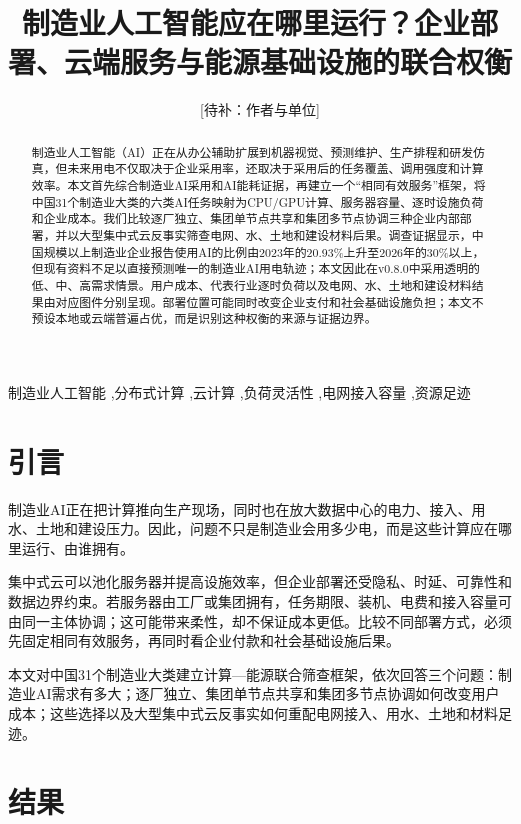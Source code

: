 \documentclass[preprint,12pt]{elsarticle}
\newcommand{\tbd}[1]{\textcolor{red!70!black}{[待补：#1]}}
\begin{document}
\begin{frontmatter}

\title{制造业人工智能应在哪里运行？企业部署、云端服务与能源基础设施的联合权衡}

\author{\tbd{作者与单位}}

\begin{abstract}
制造业人工智能（AI）正在从办公辅助扩展到机器视觉、预测维护、生产排程和研发仿真，但未来用电不仅取决于企业采用率，还取决于采用后的任务覆盖、调用强度和计算效率。本文首先综合制造业AI采用和AI能耗证据，再建立一个“相同有效服务”框架，将中国31个制造业大类的六类AI任务映射为CPU/GPU计算、服务器容量、逐时设施负荷和企业成本。我们比较逐厂独立、集团单节点共享和集团多节点协调三种企业内部部署，并以大型集中式云反事实筛查电网、水、土地和建设材料后果。调查证据显示，中国规模以上制造业企业报告使用AI的比例由2023年的20.93\%上升至2026年的30\%以上，但现有资料不足以直接预测唯一的制造业AI用电轨迹；本文因此在v0.8.0中采用透明的低、中、高需求情景。用户成本、代表行业逐时负荷以及电网、水、土地和建设材料结果由对应图件分别呈现。部署位置可能同时改变企业支付和社会基础设施负担；本文不预设本地或云端普遍占优，而是识别这种权衡的来源与证据边界。
\end{abstract}

\begin{keyword}
制造业人工智能 \sep 分布式计算 \sep 云计算 \sep 负荷灵活性 \sep 电网接入容量 \sep 资源足迹
\end{keyword}

\end{frontmatter}

\section*{引言}

制造业AI正在把计算推向生产现场，同时也在放大数据中心的电力、接入、用水、土地和建设压力。因此，问题不只是制造业会用多少电，而是这些计算应在哪里运行、由谁拥有。

集中式云可以池化服务器并提高设施效率，但企业部署还受隐私、时延、可靠性和数据边界约束。若服务器由工厂或集团拥有，任务期限、装机、电费和接入容量可由同一主体协调；这可能带来柔性，却不保证成本更低。比较不同部署方式，必须先固定相同有效服务，再同时看企业付款和社会基础设施后果。

本文对中国31个制造业大类建立计算---能源联合筛查框架，依次回答三个问题：制造业AI需求有多大；逐厂独立、集团单节点共享和集团多节点协调如何改变用户成本；这些选择以及大型集中式云反事实如何重配电网接入、用水、土地和材料足迹。

\section*{结果}
\end{document}
